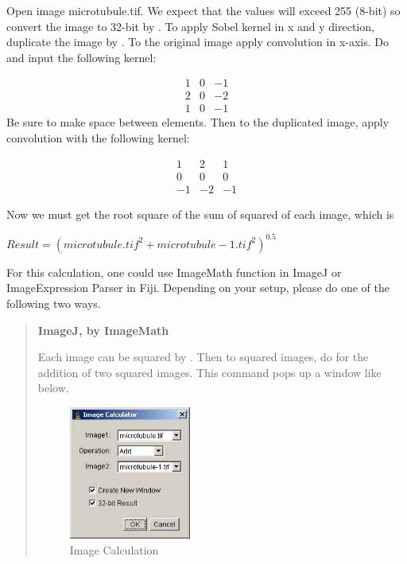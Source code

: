 \begin{indentexercise}{1}
Open image microtubule.tif. We expect that the values will exceed 255 (8-bit) so convert the image to
32-bit by . To apply Sobel kernel in x and y direction, duplicate the image by . 
To the original image apply convolution in x-axis. 
Do  and input the following kernel:

\[
 \begin{matrix}
  1 & 0 & -1 \\
  2 & 0 & -2 \\
  1 & 0 & -1
 \end{matrix}
\]
Be sure to make space between elements. Then to the duplicated image,
apply convolution with the following kernel:

\[
 \begin{matrix}
  1 & 2 & 1 \\
  0 & 0 & 0 \\
  -1 & -2 & -1
 \end{matrix}
\]

Now we must get the root square of the sum of squared of each image,
which is

$Result =(microtubule.tif^{2}+ microtubule-1.tif^{2})^{0.5}$

For this calculation, one could use ImageMath function in ImageJ or ImageExpression Parser in Fiji. Depending on your setup, please do one of the following two ways. 

\begin{quote}
\textbf{ImageJ, by ImageMath}

Each image can be squared by . 
Then to squared images, do  for the addition of two squared images. This command pops up a window like below. 

\begin{figure}[htbp]
\begin{center}
\includegraphics[width=4cm]{img/CMCIBasicCourse201102-img110.jpg}
\caption{ Image Calculation}
\label{fig:ImageCalculatorDialog}
\end{center}
\end{figure}


\end{quote}
\end{indentexercise}
